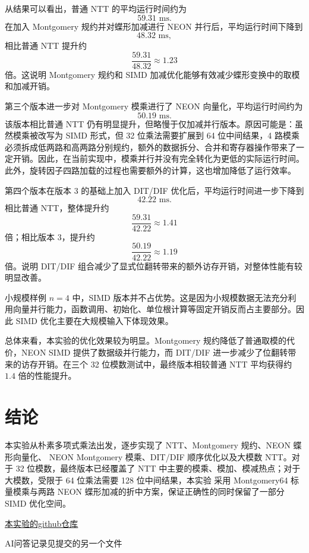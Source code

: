 \documentclass[a4paper]{article}
\begin{document}
从结果可以看出，普通 NTT 的平均运行时间约为
\[
59.31\text{ ms}.
\]
在加入 Montgomery 规约并对蝶形加减进行 NEON 并行后，平均运行时间下降到
\[
48.32\text{ ms},
\]
相比普通 NTT 提升约
\[
\frac{59.31}{48.32}\approx 1.23
\]
倍。这说明 Montgomery 规约和 SIMD 加减优化能够有效减少蝶形变换中的取模和加减开销。

第三个版本进一步对 Montgomery 模乘进行了 NEON 向量化，平均运行时间约为
\[
50.19\text{ ms}.
\]
该版本相比普通 NTT 仍有明显提升，但略慢于仅加减并行版本。原因可能是：虽然模乘被改写为 SIMD 形式，但 32 位乘法需要扩展到 64 位中间结果，4 路模乘必须拆成低两路和高两路分别规约，额外的数据拆分、合并和寄存器操作带来了一定开销。因此，在当前实现中，模乘并行并没有完全转化为更低的实际运行时间。
此外，旋转因子四路加载的过程也需要额外的计算，这也增加降低了运行效率。

第四个版本在版本 3 的基础上加入 DIT/DIF 优化后，平均运行时间进一步下降到
\[
42.22\text{ ms}.
\]
相比普通 NTT，整体提升约
\[
\frac{59.31}{42.22}\approx 1.41
\]
倍；相比版本 3，提升约
\[
\frac{50.19}{42.22}\approx 1.19
\]
倍。说明 DIT/DIF 组合减少了显式位翻转带来的额外访存开销，对整体性能有较明显改善。

小规模样例 \(n=4\) 中，SIMD 版本并不占优势。这是因为小规模数据无法充分利用向量并行能力，函数调用、初始化、单位根计算等固定开销反而占主要部分。因此 SIMD 优化主要在大规模输入下体现效果。

总体来看，本实验的优化效果较为明显。Montgomery 规约降低了普通取模的代价，NEON SIMD 提供了数据级并行能力，而 DIT/DIF 进一步减少了位翻转带来的访存开销。在三个 32 位模数测试中，最终版本相较普通 NTT 平均获得约 \(1.4\) 倍的性能提升。

\section{结论}

本实验从朴素多项式乘法出发，逐步实现了 NTT、Montgomery 规约、NEON 蝶形向量化、
NEON Montgomery 模乘、DIT/DIF 顺序优化以及大模数 NTT。对于 32 位模数，最终版本已经覆盖了
NTT 中主要的模乘、模加、模减热点；对于大模数，受限于 64 位乘法需要 128 位中间结果，本实验
采用 Montgomery64 标量模乘与两路 NEON 蝶形加减的折中方案，保证正确性的同时保留了一部分
SIMD 优化空间。

\href{https://github.com/huiqwq/-}{本实验的github仓库}

AI问答记录见提交的另一个文件
\end{document}
